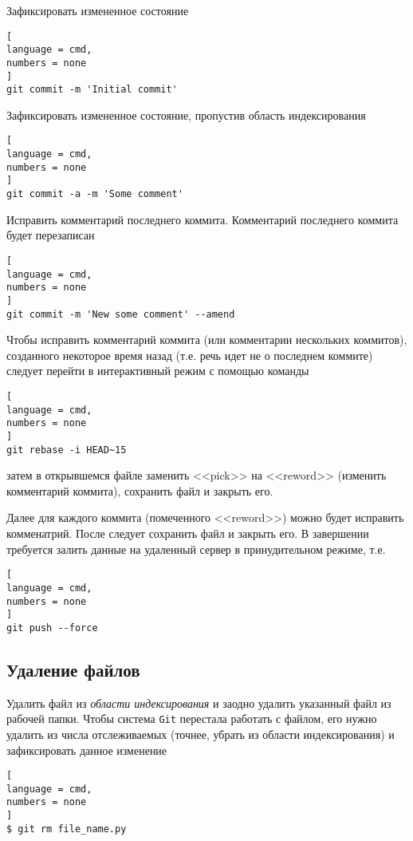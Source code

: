 \documentclass[%
	11pt,
	a4paper,
	utf8,
		]{article}
\begin{document}
Зафиксировать измененное состояние

\begin{lstlisting}[
language = cmd,
numbers = none
]
git commit -m 'Initial commit'
\end{lstlisting}

Зафиксировать измененное состояние, пропустив область индексирования

\begin{lstlisting}[
language = cmd,
numbers = none
]
git commit -a -m 'Some comment'
\end{lstlisting}

Исправить комментарий последнего коммита. Комментарий последнего коммита будет перезаписан

\begin{lstlisting}[
language = cmd,
numbers = none
]
git commit -m 'New some comment' --amend
\end{lstlisting}

Чтобы исправить комментарий коммита (или комментарии нескольких коммитов), созданного некоторое время назад (т.е. речь идет не о последнем коммите) следует перейти в интерактивный режим с помощью команды

\begin{lstlisting}[
language = cmd,
numbers = none
]
git rebase -i HEAD~15
\end{lstlisting}
затем в открывшемся файле заменить <<pick>> на <<reword>> (изменить комментарий коммита), сохранить файл и закрыть его.

Далее для каждого коммита (помеченного <<reword>>) можно будет исправить комменатрий. После следует сохранить файл и закрыть его. В завершении требуется залить данные на удаленный сервер в принудительном режиме, т.е.
\begin{lstlisting}[
language = cmd,
numbers = none
]
git push --force
\end{lstlisting}


\subsection{Удаление файлов}

Удалить файл из \emph{области индексирования} и заодно удалить указанный файл из рабочей папки. Чтобы система \texttt{Git} перестала работать с файлом, его нужно удалить из числа отслеживаемых (точнее, убрать из области индексирования) и зафиксировать данное изменение 

\begin{lstlisting}[
language = cmd,
numbers = none
]
$ git rm file_name.py
\end{lstlisting}
\end{document}
